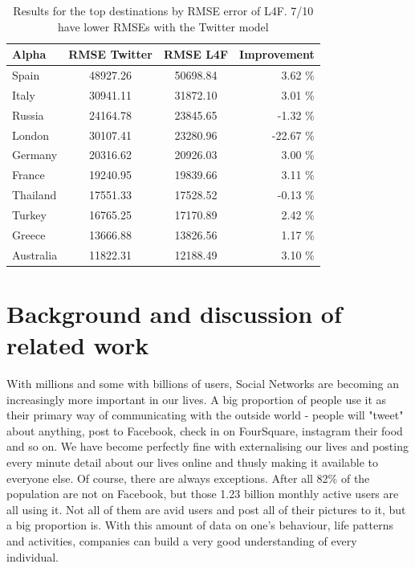 \documentclass[minf,frontabs,twoside,singlespacing,parskip]{infthesis}
\begin{document}
\begin{table}[h]
\begin{center}
\begin{tabular}{ l | c | c | r}
Alpha & RMSE Twitter & RMSE L4F & Improvement \\
\hline
Spain & 48927.26 & 50698.84 & 3.62 \% \\ 
Italy & 30941.11 & 31872.10 & 3.01 \% \\ 
Russia & 24164.78 & 23845.65 & -1.32 \% \\ 
London & 30107.41 & 23280.96 & -22.67 \% \\ 
Germany & 20316.62 & 20926.03 & 3.00 \% \\ 
France & 19240.95 & 19839.66 & 3.11 \% \\ 
Thailand & 17551.33 & 17528.52 & -0.13 \% \\ 
Turkey & 16765.25 & 17170.89 & 2.42 \% \\ 
Greece & 13666.88 & 13826.56 & 1.17 \% \\ 
Australia & 11822.31 & 12188.49 & 3.10 \% \\
\end{tabular}
\end{center}
\caption{Results for the top destinations by RMSE error of L4F. 7/10 have lower RMSEs with the Twitter model}
\end{table}



\chapter{Background and discussion of related work}


With millions and some with billions of users, Social Networks are becoming an increasingly more important in our lives. A big proportion of people use it as their primary way of communicating with the outside world - people will "tweet" about anything, post to Facebook, check in on FourSquare, instagram their food and so on. We have become perfectly fine with externalising our lives and posting every minute detail about our lives online and thusly making it available to everyone else. 
Of course, there are always exceptions. After all 82\% of the population are not on Facebook, but those 1.23 billion monthly active users are all using it. Not all of them are avid users and post all of their pictures to it, but a big proportion is. With this amount of data on one's behaviour, life patterns and activities, companies can build a very good understanding of every individual. 
\end{document}
